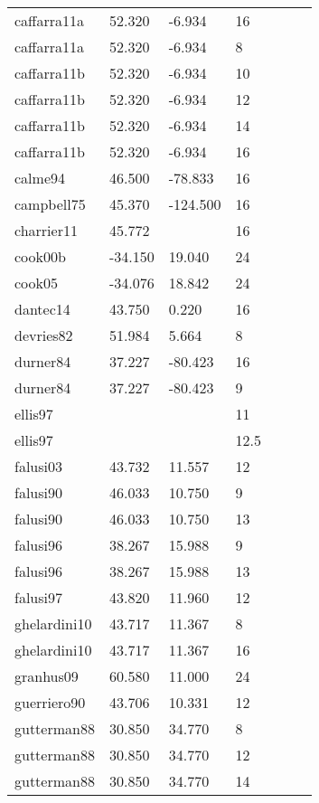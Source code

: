 \documentclass{article}
\begin{document}
\begin{table}[ht]
\begin{tabular}{|p{}|p{}|p{}|p{}|p{}|p{}|p{}|}
  caffarra11a & 52.320 & -6.934 & 16 &  &  &  \\ 
  caffarra11a & 52.320 & -6.934 & 8 &  &  &  \\ 
  caffarra11b & 52.320 & -6.934 & 10 &  &  &  \\ 
  caffarra11b & 52.320 & -6.934 & 12 &  &  &  \\ 
  caffarra11b & 52.320 & -6.934 & 14 &  &  &  \\ 
  caffarra11b & 52.320 & -6.934 & 16 &  &  &  \\ 
  calme94 & 46.500 & -78.833 & 16 &  &  &  \\ 
  campbell75 & 45.370 & -124.500 & 16 &  &  &  \\ 
  charrier11 & 45.772 &  & 16 &  &  &  \\ 
  cook00b & -34.150 & 19.040 & 24 &  &  &  \\ 
  cook05 & -34.076 & 18.842 & 24 &  &  &  \\ 
  dantec14 & 43.750 & 0.220 & 16 &  &  &  \\ 
  devries82 & 51.984 & 5.664 & 8 &  &  &  \\ 
  durner84 & 37.227 & -80.423 & 16 &  &  &  \\ 
  durner84 & 37.227 & -80.423 & 9 &  &  &  \\ 
  ellis97 &  &  & 11 &  &  &  \\ 
  ellis97 &  &  & 12.5 &  &  &  \\ 
  falusi03 & 43.732 & 11.557 & 12 &  &  &  \\ 
  falusi90 & 46.033 & 10.750 & 9 &  &  &  \\ 
  falusi90 & 46.033 & 10.750 & 13 &  &  &  \\ 
  falusi96 & 38.267 & 15.988 & 9 &  &  &  \\ 
  falusi96 & 38.267 & 15.988 & 13 &  &  &  \\ 
  falusi97 & 43.820 & 11.960 & 12 &  &  &  \\ 
  ghelardini10 & 43.717 & 11.367 & 8 &  &  &  \\ 
  ghelardini10 & 43.717 & 11.367 & 16 &  &  &  \\ 
  granhus09 & 60.580 & 11.000 & 24 &  &  &  \\ 
  guerriero90 & 43.706 & 10.331 & 12 &  &  &  \\ 
  gutterman88 & 30.850 & 34.770 & 8 &  &  &  \\ 
  gutterman88 & 30.850 & 34.770 & 12 &  &  &  \\ 
  gutterman88 & 30.850 & 34.770 & 14 &  &  &  \\ 

\end{tabular}
\end{table}
\end{document}
